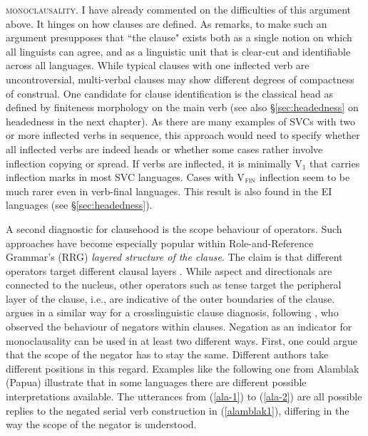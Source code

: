 \textsc{monoclausality}. I have already commented on the difficulties of this argument above. It hinges on how clauses are defined. As \citet[26]{lane2008kalam} remarks, to make such an argument presupposes that ``the clause" exists both as a single notion on which all linguists can agree, and as a linguistic unit that is clear-cut and identifiable across all languages. While typical clauses with one inflected verb are uncontroversial, multi-verbal clauses may show different degrees of compactness of construal. One candidate for clause identification is the classical head as defined by finiteness morphology on the main verb (see also §\ref{sec:headedness} on headedness in the next chapter). As there are many examples of SVCs with two or more inflected verbs in sequence, this approach would need to specify whether all inflected verbs are indeed heads or whether some cases rather involve inflection copying or spread. If verbs are inflected, it is minimally V$_1$ that carries inflection marks in most SVC languages. Cases with V$_{\textsc{fin}}$ inflection seem to be much rarer even in verb-final languages. This result is also found in the EI languages (see §\ref{sec:headedness}).

A second diagnostic for clausehood is the scope behaviour of operators. Such approaches have become especially popular within Role-and-Reference Grammar's (RRG) \textit{layered structure of the clause}. The claim is that different operators target different clausal layers \citep{foley1984functional}. While aspect and directionals are connected to the nucleus, other operators such as tense target the peripheral layer of the clause, i.e., are indicative of the outer boundaries of the clause. \citet{haspelmath2016serial} argues in a similar way for a crosslinguistic clause diagnosis, following \citet{bohnemeyer2007principles}, who observed the behaviour of negators within clauses. Negation as an indicator for monoclausality can be used in at least two different ways. First, one could argue that the scope of the negator has to stay the same. Different authors take different positions in this regard. Examples like the following one from Alamblak (Papua) illustrate that in some languages there are different possible interpretations available. The utterances from (\ref{ala-1}) to (\ref{ala-2}) are all possible replies to the negated serial verb construction in (\ref{alamblak1}), differing in the way the scope of the negator is understood.

